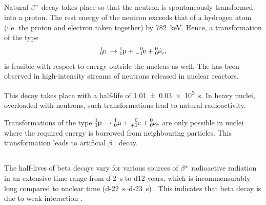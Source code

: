 \subsection{}\label{42.6.3} Natural $\beta^{-}$ decay takes place so that the neutron  is spontaneously transformed into a proton. The rest energy  of the neutron exceeds that of a hydrogen atom (i.e. the proton and electron taken together) by \SI{782}{\kilo\electronvolt}. Hence, a transformation of the type  
\begin{equation*}%
\ce{^{1}_{0}n \to ^{1}_{1}p +  ^{0}_{-1}e + ^{0}_{0}\tilde{\nu_{e}}},
\end{equation*}
is feasible with respect to energy outside the nucleus as well. The  has been observed in high-intensity streams of neutrons released in nuclear reactors.

This decay takes place with a half-life  of \SI{1.01(3)e3}{\second}. In heavy nuclei, overloaded with neutrons, such transformations lead to natural radioactivity.

Transformations  of the type $\ce{^{1}_{1}{p} \to ^{1}_{0}{n} + ^{0}_{+1}{e} + ^{0}_{0}{\nu_{e}}}$ are only possible in nuclei where the required energy is borrowed from neighbouring particles. This transformation leads to artificial $\beta^{+}$ decay.

\subsection{}\label{42.6.4} The half-lives of beta decays  vary for various sources of $\beta^{\pm}$ radioactive radiation in an extensive time range from \SI{d-2}{\second} to \num{d12} years, which is incommensurably long compared to nuclear time (\qtyrange{d-22}{d-23}{\second}) . This indicates that beta decay is due to weak interaction .

